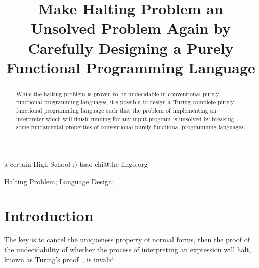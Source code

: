 \documentclass[11pt,preprint,numbers]{sigplanconf}
\begin{document}

\title{Make Halting Problem an Unsolved Problem Again by Carefully Designing a Purely Functional Programming Language}

           {a certain High School :)}
           {tsao-chi@the-lingo.org}

\maketitle

\begin{abstract}

While the halting problem is proven to be undecidable in conventional purely functional programming languages,
it's possible to design a Turing-complete purely functional programming language
such that the problem of implementing an interpreter which will finish running for any input program is unsolved
by breaking some fundamental properties of conventional purely functional programming languages.
\end{abstract}

{\footnotesize
{}
\keywords
Halting Problem; Language Design;
}


\section{Introduction}

The key is to cancel the uniqueness property of normal forms, then the proof of the undecidability of whether the process of interpreting an expression will halt, known as Turing's proof~\citep{turing_paper}, is invalid.
\end{document}
